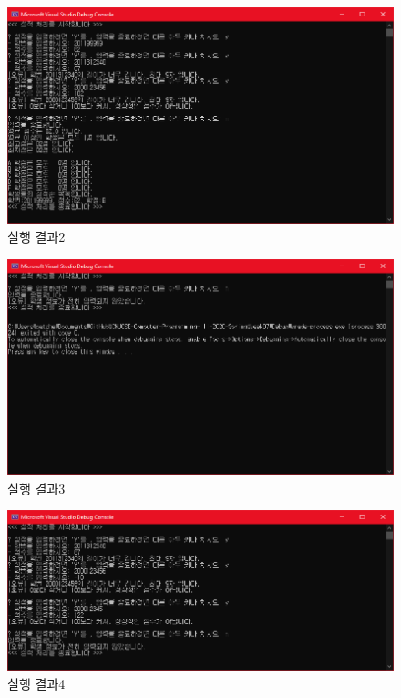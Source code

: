\documentclass[UTF8]{report}
\begin{document}
        \begin{figure}[!htb]
            \centering
            \includegraphics[width=\textwidth]{output_2.png}
            \caption{실행 결과2}
        \end{figure}

        \begin{figure}[!htb]
            \centering
            \includegraphics[width=\textwidth]{output_3.png}
            \caption{실행 결과3}
        \end{figure}

        \begin{figure}[!htb]
            \centering
            \includegraphics[width=\textwidth]{output_4.png}
            \caption{실행 결과4}
        \end{figure}
\end{document}
